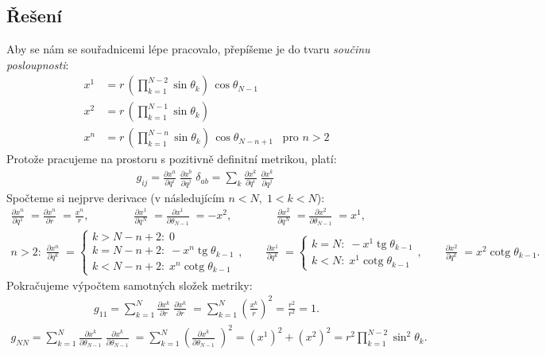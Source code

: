 \documentclass[10pt,a4paper]{article}
\newcommand{\tg}{\operatorname{tg}}
\newcommand{\cotg}{\operatorname{cotg}}
\newcommand{\pd}[2]{\frac{\partial  #1}{\partial  #2} \;}
\begin{document}
\subsection{Řešení}
Aby se nám se souřadnicemi lépe pracovalo, přepíšeme je do tvaru \textit{součinu posloupnosti}:
\begin{align*}
    x^1 &= r \, \left( \prod_{k=1}^{N-2} \sin \theta_k \right) \, \cos \theta_{N-1}
    \\[5pt]
    x^2 &= r \, \left( \prod_{k=1}^{N-1} \sin \theta_k \right)
    \\[5pt]
    x^n &= r \, \left( \prod_{k=1}^{N-n} \sin \theta_k \right) \, \cos \theta_{N-n+1} \;\;\; \text{pro } n>2
\end{align*}
Protože pracujeme na prostoru s pozitivně definitní metrikou, platí:
\begin{align*}
    g_{ij} = \pd{x^a}{q^i} \pd{x^b}{q^j} \delta_{ab}
    = \sum_k \pd{x^k}{q^i} \pd{x^k}{q^j}
\end{align*}
Spočteme si nejprve derivace (v následujícím $n<N, \; 1<k<N$):
\begin{gather*}
    \pd{x^n}{q^1} = \pd{x^n}{r} = \frac{x^n}{r},
    \hspace{4em}
    \pd{x^1}{q^N} = \pd{x^1}{\theta_{N-1}} = - x^2,
    \hspace{4em}
    \pd{x^2}{q^N} = \pd{x^2}{\theta_{N-1}} = x^1,
    \\[5pt]
    n > 2: \;
    \pd{x^n}{q^k} = \begin{cases}
        k>N-n+2: \; 0 \\
        k=N-n+2: \; - x^n \tg \theta_{k-1} \\
        k<N-n+2: \; x^n \cotg \theta_{k-1}
    \end{cases},
    \hspace{2em}
    \pd{x^1}{q^k} = \begin{cases}
        k=N: \; - x^1 \tg \theta_{k-1} \\
        k<N: \; x^1 \cotg \theta_{k-1}
    \end{cases},
    \hspace{2em}
    \pd{x^2}{q^k} = x^2 \cotg \theta_{k-1}.
\end{gather*}
Pokračujeme výpočtem samotných složek metriky:
\begin{align*}
    g_{11} = \sum_{k=1}^N \pd{x^k}{r} \pd{x^k}{r} = \sum_{k=1}^N \left(\frac{x^k}{r}\right)^2 = \frac{r^2}{r^2} = 1.
\end{align*}
\begin{align*}
    g_{NN} = \sum_{k=1}^N \pd{x^k}{\theta_{N-1}} \pd{x^k}{\theta_{N-1}} = \sum_{k=1}^N \left( \pd{x^k}{\theta_{N-1}} \right)^2 = \left( x^1 \right)^2 + \left( x^2 \right)^2 = r^2 \prod_{k=1}^{N-2} \sin^2 \theta_k.
\end{align*}
\end{document}
